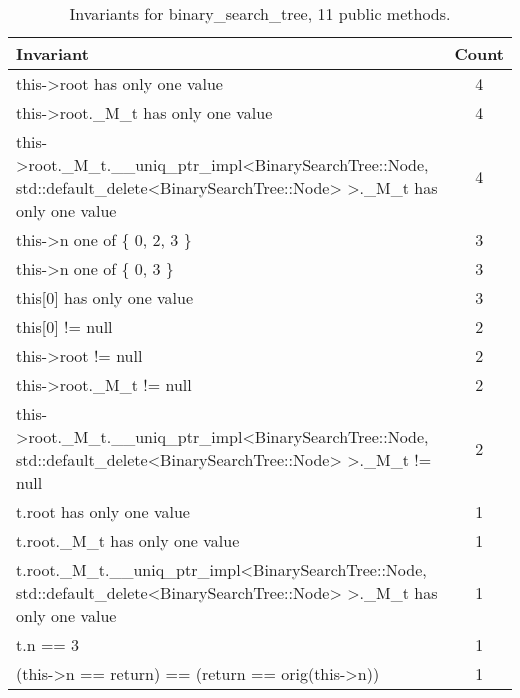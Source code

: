 \begin{table}[ht]
\centering
\scriptsize
\caption{Invariants for binary\_search\_tree, 11 public methods.}
\label{binary_search_tree_daikon}
\begin{tabular}{|l|c|}
\hline
Invariant & Count \\
\hline
this->root has only one value & 4 \\
this->root.\_M\_t has only one value & 4 \\
this->root.\_M\_t.\_\_uniq\_ptr\_impl<BinarySearchTree::Node, std::default\_delete<BinarySearchTree::Node> >.\_M\_t has only one value & 4 \\
this->n one of \{ 0, 2, 3 \} & 3 \\
this->n one of \{ 0, 3 \} & 3 \\
this[0] has only one value & 3 \\
this[0] != null & 2 \\
this->root != null & 2 \\
this->root.\_M\_t != null & 2 \\
this->root.\_M\_t.\_\_uniq\_ptr\_impl<BinarySearchTree::Node, std::default\_delete<BinarySearchTree::Node> >.\_M\_t != null & 2 \\
t.root has only one value & 1 \\
t.root.\_M\_t has only one value & 1 \\
t.root.\_M\_t.\_\_uniq\_ptr\_impl<BinarySearchTree::Node, std::default\_delete<BinarySearchTree::Node> >.\_M\_t has only one value & 1 \\
t.n == 3 & 1 \\
(this->n == return) == (return == orig(this->n)) & 1 \\
\hline
\end{tabular}
\end{table}

